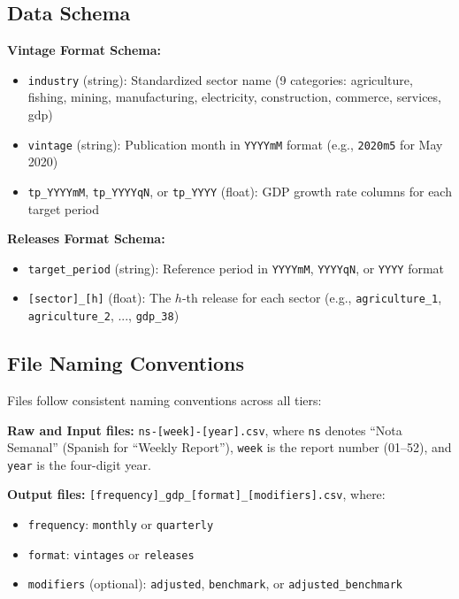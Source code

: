 \documentclass[12pt]{article}
\begin{document}
\subsection*{Data Schema}

\textbf{Vintage Format Schema:}

\begin{itemize}
    \item \texttt{industry} (string): Standardized sector name (9 categories: agriculture, fishing, mining, manufacturing,
   electricity, construction, commerce, services, gdp)
    \item \texttt{vintage} (string): Publication month in \texttt{YYYYmM} format (e.g., \texttt{2020m5} for May 2020)
    \item \texttt{tp\_YYYYmM}, \texttt{tp\_YYYYqN}, or \texttt{tp\_YYYY} (float): GDP growth rate columns for each target
  period
\end{itemize}

\textbf{Releases Format Schema:}
  
\begin{itemize}
    \item \texttt{target\_period} (string): Reference period in \texttt{YYYYmM}, \texttt{YYYYqN}, or \texttt{YYYY} format
    \item \texttt{[sector]\_[h]} (float): The $h$-th release for each sector (e.g., \texttt{agriculture\_1},
    \texttt{agriculture\_2}, ..., \texttt{gdp\_38})
\end{itemize}

\subsection*{File Naming Conventions}

Files follow consistent naming conventions across all tiers:

\textbf{Raw and Input files:} \texttt{ns-[week]-[year].csv}, where \texttt{ns} denotes ``Nota Semanal'' (Spanish for ``Weekly Report''), \texttt{week} is the report number (01--52), and \texttt{year} is the four-digit year.

\textbf{Output files:} \texttt{[frequency]\_gdp\_[format]\_[modifiers].csv}, where:
  
\begin{itemize}
    \item \texttt{frequency}: \texttt{monthly} or \texttt{quarterly}
    \item \texttt{format}: \texttt{vintages} or \texttt{releases}
    \item \texttt{modifiers} (optional): \texttt{adjusted}, \texttt{benchmark}, or \texttt{adjusted\_benchmark}
\end{itemize}
\end{document}
